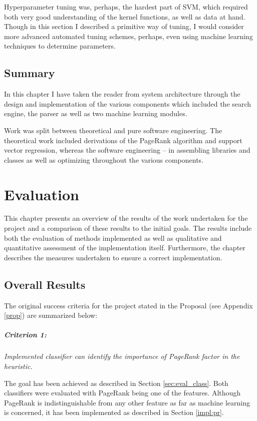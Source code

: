 \documentclass[12pt,notitlepage,twoside]{scrreprt}
\begin{document}
Hyperparameter tuning was, perhaps, the hardest part of SVM, which required both very good
understanding of the kernel functions, as well as data at hand. Though in this section I
described a primitive way of tuning, I would consider more advanced automated tuning
schemes, perhaps, even using machine learning techniques to determine parameters.

\section{Summary}
In this chapter I have taken the reader from system architecture through the design and
implementation of the various components which included the search engine, the parser as
well as two machine learning modules.

Work was split between theoretical and pure software engineering. The theoretical work
included derivations of the PageRank algorithm and support vector regression, whereas the
software engineering -- in assembling libraries and classes as well as optimizing
throughout the various components.

\chapter{Evaluation}
This chapter presents an overview of the results of the work undertaken for the project
and a comparison of these results to the initial goals.  The results include both the
evaluation of methods implemented as well as qualitative and quantitative assessment of
the implementation itself. Furthermore, the chapter describes the measures undertaken to
ensure a correct implementation.

\section{Overall Results}
The original success criteria for the project stated in the Proposal (see Appendix
\ref{prop}) are summarized below:

\paragraph{Criterion 1:}\textit{Implemented classifier can identify the importance of
PageRank factor in the heuristic.}

The goal has been achieved as described in Section \ref{sec:eval_class}. Both classifiers were
evaluated with PageRank being one of the features. Although PageRank is indistinguishable
from any other feature as far as machine learning is concerned, it has been implemented as
described in Section \ref{impl:pr}.
\end{document}

